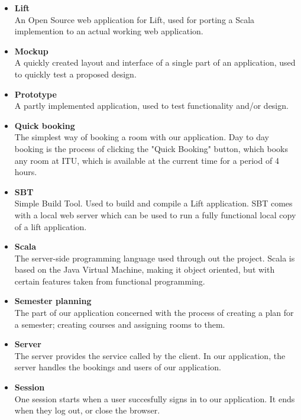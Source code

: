 \begin{itemize}
\item \textbf{Lift}\\
An Open Source web application for Lift, used for porting a Scala implemention to an actual working web application.

\item \textbf{Mockup}\\
A quickly created layout and interface of a single part of an application, used to quickly test a proposed design.

\item \textbf{Prototype}\\
A partly implemented application, used to test functionality and/or design.


\item \textbf{Quick booking}\\
The simplest way of booking a room with our application. Day to day booking is the process of clicking the "Quick Booking" button, which books any room at ITU, which is available at the current time for a period of 4 hours.

\item \textbf{SBT}\\
Simple Build Tool. Used to build and compile a Lift application. SBT comes with a local web server which can be used to run a fully functional local copy of a lift application.	


\item \textbf{Scala}\\
The server-side programming language used through out the project. Scala is based on the Java Virtual Machine, making it object oriented, but with certain features taken from functional programming.

\item \textbf{Semester planning}\\
The part of our application concerned with the process of creating a plan for a semester; creating courses and assigning rooms to them.

\item \textbf{Server}\\
The server provides the service called by the client. In our application, the server handles the bookings and users of our application.

\item \textbf{Session}\\
One session starts when a user succesfully signs in to our application. It ends when they log out, or close the browser.


\end{itemize}
